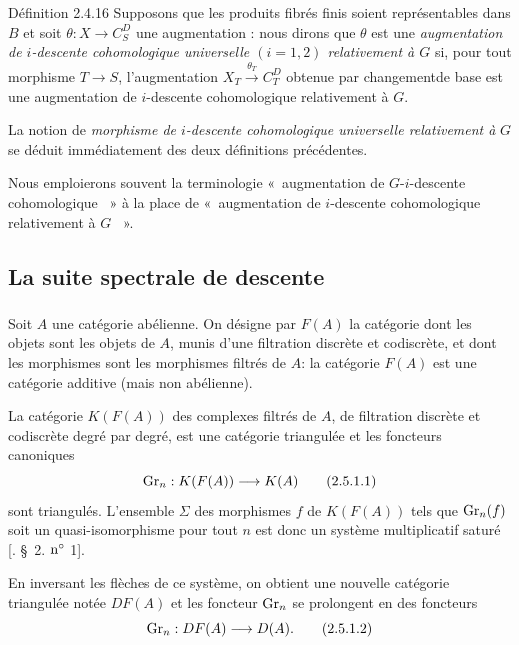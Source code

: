 \documentclass[10pt]{../fichiers-configuration-latex/smfart}
\begin{document}
\begin{enonce*}{Définition 2.4.16}
Supposons que les produits fibrés finis soient représentables dans $B$
et soit $\theta : X \to C^D_S$ une augmentation : nous dirons que
$\theta$ est une \emph{augmentation de $i$-descente cohomologique
universelle $(i = 1, 2)$ relativement à $G$} si, pour tout morphisme $T
\to S$, l'augmentation $X_T \xrightarrow{\theta_T} C^D_T$ obtenue par
changement\pageoriginale de base est une augmentation de $i$-descente
cohomologique relativement à $G$.
\end{enonce*}

La notion de \emph{morphisme de $i$-descente cohomologique universelle
relativement à} $G$ se déduit immédiatement des deux définitions
précédentes.

Nous emploierons souvent la terminologie « augmentation de
$G$-$i$-descente cohomologique  » à la place de « augmentation de
$i$-descente cohomologique relativement à $G$  ».

\subsection{La suite spectrale de descente}

\subsubsection{}
Soit $A$ une catégorie abélienne. On désigne par $F(A)$ la catégorie
dont les objets sont les objets de $A$, munis d'une filtration discrète
et codiscrète, et dont les morphismes sont les morphismes filtrés de
$A$: la catégorie $F(A)$ est une catégorie additive (mais non
abélienne).

La catégorie $K(F(A))$ des complexes filtrés de $A$, de filtration
discrète et codiscrète degré par degré, est une catégorie triangulée
et les foncteurs canoniques
\begin{equation*}
\operatorname{Gr}_n : K(F(A)) \longrightarrow K(A)\tag{2.5.1.1}
\end{equation*}
sont triangulés. L'ensemble $\Sigma$ des morphismes $f$ de $K(F(A))$
tels que $\operatorname{Gr}_n(f)$ soit un quasi-isomorphisme pour tout $n$ est donc
un système multiplicatif saturé [\cf \cite{SGA4-05bis:9}. \S~2. ${\rm n^\circ}$ 1].

En inversant les flèches de ce système, on obtient une nouvelle
catégorie triangulée notée $D F(A)$ et les foncteur $\operatorname{Gr}_n$ se
prolongent en des foncteurs
\begin{equation*}
\operatorname{Gr}_n : D F(A) \longrightarrow D(A){}.\tag{2.5.1.2}
\end{equation*}
\end{document}
